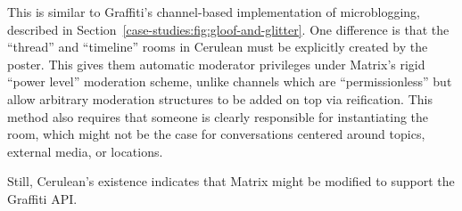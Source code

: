 

This is similar to Graffiti's channel-based implementation of microblogging, described
in Section~\ref{case-studies:fig:gloof-and-glitter}.
One difference is that the ``thread'' and ``timeline'' rooms
in Cerulean
must be explicitly created by the poster.
This gives them automatic moderator privileges
under Matrix's rigid ``power level'' moderation
scheme, unlike channels
which are ``permissionless'' but allow arbitrary
moderation structures to be added on top via
reification.
This method also requires that someone is clearly responsible for instantiating the room,
which might not be the case for conversations centered around topics, external media, or locations.

Still, Cerulean's existence indicates that
Matrix might be modified to support the Graffiti API.





